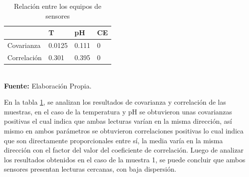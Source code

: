 \begin{table}[]
\caption{Relaci\'on entre los equipos de sensores}
\label{tab:VaCoM1}
\centering
\begin{tabular}{llll} 
\toprule
& T   &  pH    & CE \\
\midrule
Covarianza  & 0.0125& 0.111 & 0                \\
Correlación & 0.301& 0.395 & 0        \\
\bottomrule
\end{tabular}
\\ \textbf{Fuente: }Elaboración Propia.
\end{table}     


En la tabla \ref{tab:VaCoM1}, se analizan los resultados de covarianza y correlación de las muestras, en el caso de la temperatura y pH se obtuvieron unas covarianzas positivas el cual indica que ambas lecturas varían en la misma dirección, as\'i mismo en ambos par\'ametros se obtuvieron correlaciones positivas lo cual indica que son directamente proporcionales entre sí, la media varía en la misma dirección con el factor del valor del coeficiente de correlación. Luego de analizar los resultados obtenidos en el caso de la muestra 1, se puede concluir que ambos sensores presentan lecturas cercanas, con baja dispersi\'on. 

